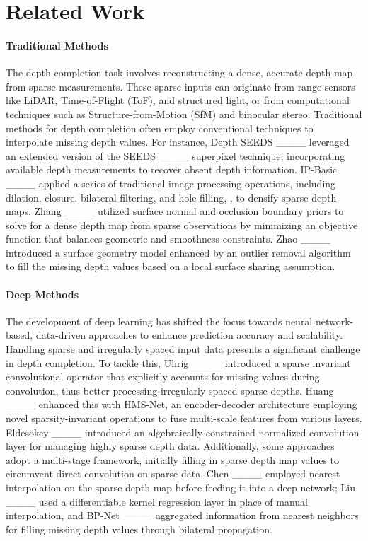 \section{Related Work}

\paragraph{Traditional Methods}
The depth completion task involves reconstructing a dense, accurate depth map from sparse measurements. These sparse inputs can originate from range sensors like LiDAR, Time-of-Flight (ToF), and structured light, or from computational techniques such as Structure-from-Motion (SfM) and binocular stereo. Traditional methods for depth completion often employ conventional techniques to interpolate missing depth values. For instance, Depth SEEDS ____ leveraged an extended version of the SEEDS ____ superpixel technique, incorporating available depth measurements to recover absent depth information. IP-Basic ____ applied a series of traditional image processing operations, including dilation, closure, bilateral filtering, and hole filling, \etc, to densify sparse depth maps. Zhang \etal ____ utilized surface normal and occlusion boundary priors to solve for a dense depth map from sparse observations by minimizing an objective function that balances geometric and smoothness constraints. Zhao \etal ____ introduced a surface geometry model enhanced by an outlier removal algorithm to fill the missing depth values based on a local surface sharing assumption. 

\paragraph{Deep Methods}
The development of deep learning has shifted the focus towards neural network-based, data-driven approaches to enhance prediction accuracy and scalability. Handling sparse and irregularly spaced input data presents a significant challenge in depth completion. To tackle this, Uhrig \etal ____ introduced a sparse invariant convolutional operator that explicitly accounts for missing values during convolution, thus better processing irregularly spaced sparse depths. Huang \etal ____ enhanced this with HMS-Net, an encoder-decoder architecture employing novel sparsity-invariant operations to fuse multi-scale features from various layers. Eldesokey \etal ____ introduced an algebraically-constrained normalized convolution layer for managing highly sparse depth data. Additionally, some approaches adopt a multi-stage framework, initially filling in sparse depth map values to circumvent direct convolution on sparse data. Chen \etal ____ employed nearest interpolation on the sparse depth map before feeding it into a deep network; Liu \etal ____ used a differentiable kernel regression layer in place of manual interpolation, and BP-Net ____ aggregated information from nearest neighbors for filling missing depth values through bilateral propagation.

